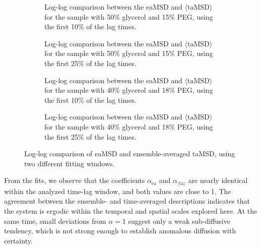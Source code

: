 \begin{figure}[!htbp]
    \centering
    \begin{subfigure}[t]{0.48\textwidth}
        \centering
        
        \caption{Log-log comparison between the eaMSD and $\langle \mathrm{taMSD} \rangle$ for the sample with 50\% glycerol and 15\% PEG, using the first 10\% of the lag times.}
        \label{fig:eamsd_vs_tamsd_glic50_f010}
    \end{subfigure}
    \hfill
    \begin{subfigure}[t]{0.48\textwidth}
        \centering
        
        \caption{Log-log comparison between the eaMSD and $\langle \mathrm{taMSD} \rangle$ for the sample with 50\% glycerol and 15\% PEG, using the first 25\% of the lag times.}
        \label{fig:eamsd_vs_tamsd_glic50_f025}
    \end{subfigure}

    \vspace{0.5em}

    \begin{subfigure}[t]{0.48\textwidth}
        \centering
        
        \caption{Log-log comparison between the eaMSD and $\langle \mathrm{taMSD} \rangle$ for the sample with 40\% glycerol and 18\% PEG, using the first 10\% of the lag times.}
        \label{fig:eamsd_vs_tamsd_glic200_f010}
    \end{subfigure}
    \hfill
    \begin{subfigure}[t]{0.48\textwidth}
        \centering
        
        \caption{Log-log comparison between the eaMSD and $\langle \mathrm{taMSD} \rangle$ for the sample with 40\% glycerol and 18\% PEG, using the first 25\% of the lag times.}
        \label{fig:eamsd_vs_tamsd_glic200_f025}
    \end{subfigure}

    \caption{Log-log comparison of eaMSD and ensemble-averaged taMSD, using two different fitting windows.}
    \label{fig:eamsd_vs_tamsd_glic50}
\end{figure}
\FloatBarrier
From the fits, we observe that the coefficients $\alpha_{\mathrm{ea}}$ and $\alpha_{\langle \mathrm{ta} \rangle}$ are nearly identical within the analyzed time-lag window, and both values are close to 1. The agreement between the ensemble- and time-averaged descriptions indicates that the system is ergodic within the temporal and spatial scales explored here. At the same time, small deviations from $\alpha = 1$ suggest only a weak sub-diffusive tendency, which is not strong enough to establish anomalous diffusion with certainty.

